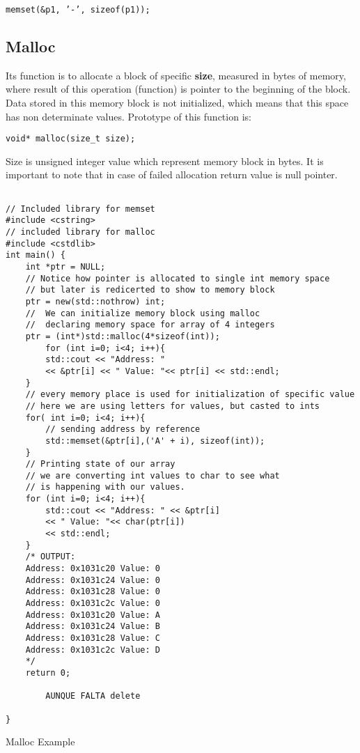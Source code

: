 \documentclass[11pt, a4paper]{article}
\begin{document}
\texttt{memset(\&p1, '-', sizeof(p1));} 


\subsection{Malloc}%
\label{sub:malloc}

Its function is to allocate a block of specific \textbf{size}, measured in bytes of memory, where result of this operation (function) is pointer to the beginning of the block. Data stored in this memory block is not initialized, which means that this space has non determinate values.
Prototype of this function is:

\texttt{void* malloc(size\_t size);} 

Size is unsigned integer value which represent memory block in bytes. It is important to note that in case of failed allocation return value is null pointer.


\begin{listing}
\begin{verbatim}

// Included library for memset
#include <cstring>
// included library for malloc
#include <cstdlib>
int main() {
    int *ptr = NULL;
    // Notice how pointer is allocated to single int memory space 
    // but later is redicerted to show to memory block
    ptr = new(std::nothrow) int;
    //  We can initialize memory block using malloc
    //  declaring memory space for array of 4 integers
    ptr = (int*)std::malloc(4*sizeof(int));
        for (int i=0; i<4; i++){
        std::cout << "Address: "
        << &ptr[i] << " Value: "<< ptr[i] << std::endl;
    }
    // every memory place is used for initialization of specific value
    // here we are using letters for values, but casted to ints
    for( int i=0; i<4; i++){
        // sending address by reference
        std::memset(&ptr[i],('A' + i), sizeof(int));
    }
    // Printing state of our array
    // we are converting int values to char to see what 
    // is happening with our values.
    for (int i=0; i<4; i++){
        std::cout << "Address: " << &ptr[i]
        << " Value: "<< char(ptr[i])
        << std::endl;
    }
    /* OUTPUT:
    Address: 0x1031c20 Value: 0
    Address: 0x1031c24 Value: 0
    Address: 0x1031c28 Value: 0
    Address: 0x1031c2c Value: 0
    Address: 0x1031c20 Value: A
    Address: 0x1031c24 Value: B
    Address: 0x1031c28 Value: C
    Address: 0x1031c2c Value: D
    */
    return 0;

		AUNQUE FALTA delete

}

\end{verbatim}
\caption{Malloc Example}
\label{lst:malloc_example}
\end{listing}
\end{document}
